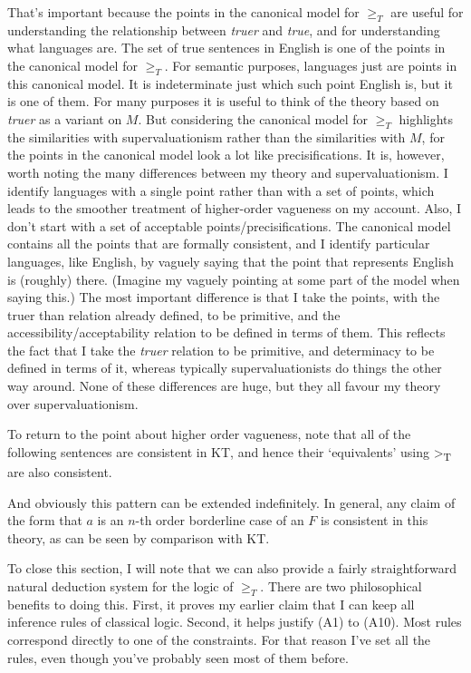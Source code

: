That's important because the points in the canonical model for
\(\geqslant _T\) are useful for understanding the relationship between
\emph{truer} and \emph{true}, and for understanding what languages are.
The set of true sentences in English is one of the points in the
canonical model for \(\geqslant _T\). For semantic purposes, languages
just are points in this canonical model. It is indeterminate just which
such point English is, but it is one of them. For many purposes it is
useful to think of the theory based on \emph{truer} as a variant on
\(M\). But considering the canonical model for \(\geqslant _T\)
highlights the similarities with supervaluationism rather than the
similarities with \(M\), for the points in the canonical model look a
lot like precisifications. It is, however, worth noting the many
differences between my theory and supervaluationism. I identify
languages with a single point rather than with a set of points, which
leads to the smoother treatment of higher-order vagueness on my account.
Also, I don't start with a set of acceptable points/precisifications.
The canonical model contains all the points that are formally
consistent, and I identify particular languages, like English, by
vaguely saying that the point that represents English is (roughly)
there. (Imagine my vaguely pointing at some part of the model when
saying this.) The most important difference is that I take the points,
with the truer than relation already defined, to be primitive, and the
accessibility/acceptability relation to be defined in terms of them.
This reflects the fact that I take the \emph{truer} relation to be
primitive, and determinacy to be defined in terms of it, whereas
typically supervaluationists do things the other way around. None of
these differences are huge, but they all favour my theory over
supervaluationism.

To return to the point about higher order vagueness, note that all of
the following sentences are consistent in KT, and hence their
`equivalents' using {\textgreater{}}\textsubscript{T} are also
consistent.

And obviously this pattern can be extended indefinitely. In general, any
claim of the form that \(a\) is an \(n\)-th order borderline case of an
\(F\) is consistent in this theory, as can be seen by comparison with
KT.

To close this section, I will note that we can also provide a fairly
straightforward natural deduction system for the logic of
\(\geqslant _T\). There are two philosophical benefits to doing this.
First, it proves my earlier claim that I can keep all inference rules of
classical logic. Second, it helps justify (A1) to (A10). Most rules
correspond directly to one of the constraints. For that reason I've set
all the rules, even though you've probably seen most of them before.

